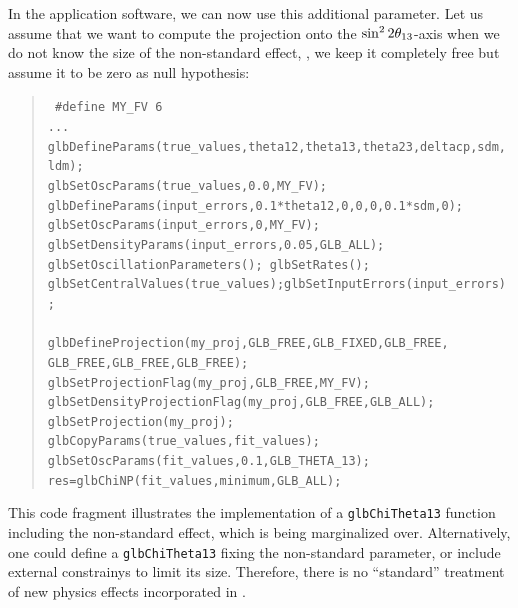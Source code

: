 {In the application software, we can now use this additional parameter. Let us assume that we
want to compute the projection onto the $\sin^2 2 \theta_{13}$-axis when we do not know the size of the  non-standard
effect, \ie, we keep it completely free but assume it to be zero as null hypothesis:
\begin{quote}
{\tt {\footnotesize
 \#define MY\_FV 6 \\
 ... \\
 glbDefineParams(true\_values,theta12,theta13,theta23,deltacp,sdm,ldm); \\
 glbSetOscParams(true\_values,0.0,MY\_FV); \\
 glbDefineParams(input\_errors,0.1*theta12,0,0,0,0.1*sdm,0); \\
 glbSetOscParams(input\_errors,0,MY\_FV);  \\
 glbSetDensityParams(input\_errors,0.05,GLB\_ALL); \\
 glbSetOscillationParameters(); glbSetRates(); \\
 glbSetCentralValues(true\_values);glbSetInputErrors(input\_errors); \\
 \\
 glbDefineProjection(my\_proj,GLB\_FREE,GLB\_FIXED,GLB\_FREE,\\
  \hspace*{2cm} GLB\_FREE,GLB\_FREE,GLB\_FREE); \\
 glbSetProjectionFlag(my\_proj,GLB\_FREE,MY\_FV); \\
 glbSetDensityProjectionFlag(my\_proj,GLB\_FREE,GLB\_ALL); \\
 glbSetProjection(my\_proj);
 \\
 glbCopyParams(true\_values,fit\_values); \\
 glbSetOscParams(fit\_values,0.1,GLB\_THETA\_13); \\
 res=glbChiNP(fit\_values,minimum,GLB\_ALL); 
}}
\end{quote}
This code fragment illustrates the implementation of a {\tt glbChiTheta13} function
including the non-standard effect, which is being marginalized over.
Alternatively, one could define a {\tt glbChiTheta13} fixing the non-standard
parameter, or include external constrainys to limit its size. Therefore, 
there is no ``standard'' treatment of new physics effects incorporated
in \GLOBES .
}


